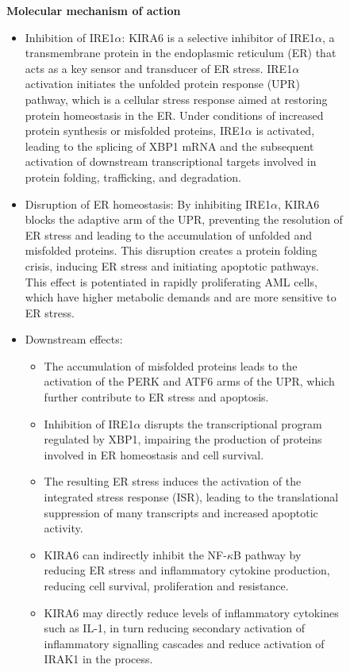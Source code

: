 \begin{figure}[htbp!]
\begin{tcolorbox}[
    colback=black!5!white,
    colframe=black!60!white,
    title=\textbf{KIRA6 for AML (continued)},
    fonttitle=\bfseries,
    arc=3mm,
    boxrule=1pt,
    bottomrule=2pt,
]
\scriptsize
\textbf{Molecular mechanism of action}
\begin{itemize}
    \item Inhibition of IRE1$\alpha$: KIRA6 is a selective inhibitor of IRE1$\alpha$, a transmembrane protein in the endoplasmic reticulum (ER) that acts as a key sensor and transducer of ER stress. IRE1$\alpha$ activation initiates the unfolded protein response (UPR) pathway, which is a cellular stress response aimed at restoring protein homeostasis in the ER. Under conditions of increased protein synthesis or misfolded proteins, IRE1$\alpha$ is activated, leading to the splicing of XBP1 mRNA and the subsequent activation of downstream transcriptional targets involved in protein folding, trafficking, and degradation.
    \item Disruption of ER homeostasis: By inhibiting IRE1$\alpha$, KIRA6 blocks the adaptive arm of the UPR, preventing the resolution of ER stress and leading to the accumulation of unfolded and misfolded proteins. This disruption creates a protein folding crisis, inducing ER stress and initiating apoptotic pathways. This effect is potentiated in rapidly proliferating AML cells, which have higher metabolic demands and are more sensitive to ER stress.
    \item Downstream effects:
    \begin{itemize}
        \item  The accumulation of misfolded proteins leads to the activation of the PERK and ATF6 arms of the UPR, which further contribute to ER stress and apoptosis.
        \item  Inhibition of IRE1$\alpha$ disrupts the transcriptional program regulated by XBP1, impairing the production of proteins involved in ER homeostasis and cell survival.
        \item  The resulting ER stress induces the activation of the integrated stress response (ISR), leading to the translational suppression of many transcripts and increased apoptotic activity.
        \item  KIRA6 can indirectly inhibit the NF-$\kappa$B pathway by reducing ER stress and inflammatory cytokine production, reducing cell survival, proliferation and resistance.
        \item  KIRA6 may directly reduce levels of inflammatory cytokines such as IL-1, in turn reducing secondary activation of inflammatory signalling cascades and reduce activation of IRAK1 in the process.

\end{itemize}
\end{itemize}
\end{tcolorbox}
\end{figure}

